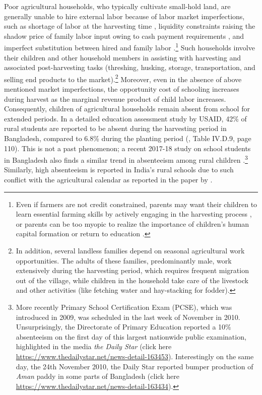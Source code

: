 \documentclass[12pt,letterpaper]{article}
\newcommand{\0}{\ensuremath{\mbox{\boldmath $0$}}}
\begin{document}
Poor agricultural households, who typically cultivate small-hold land, are generally unable to hire external labor because of labor market imperfections, such as shortage of labor at the harvesting time \citep{rosenzweig1988labor}, liquidity constraints raising the shadow price of family labor input owing to cash payment requirements \citep{singh1986agricultural}, and imperfect substitution between hired and family labor \citep{de1991peasant}.\footnote{Even if farmers are not credit constrained, parents may want their children to learn essential farming skills by actively engaging in the harvesting process \citep{bhalotra2003child}, or parents can be too myopic to realize the importance of children's human capital formation or return to education \citep{BalandRobinson2000}. } Such households involve their children and other household members in assisting with harvesting and associated post-harvesting tasks (threshing, husking, storage, transportation, and selling end products to the market).\footnote{In addition, several landless families depend on seasonal agricultural work opportunities. The adults of these families, predominantly male, work extensively during the harvesting period, which requires frequent migration out of the village, while children in the household take care of the livestock and other activities (like fetching water and hay-stacking for fodder). } Moreover, even in the absence of above mentioned market imperfections, the opportunity cost of schooling increases during harvest as the marginal revenue product of child labor increases. Consequently, children of agricultural households remain absent from school for extended periods. In a detailed education assessment study by USAID, 42\% of rural students are reported to be absent during the harvesting period in Bangladesh, compared to 6.8\% during the planting period (\cite{Rahman2004}, Table IV.D.9, page 110). This is not a past phenomenon; a recent 2017-18 study on school students in Bangladesh also finds a similar trend in absenteeism among rural children \citep{Fujii2019}.\footnote{More recently Primary School Certification Exam (PCSE), which was introduced in 2009, was scheduled in the last week of November in 2010. Unsurprisingly, the Directorate of Primary Education reported a 10$\%$ absenteeism on the first day of this largest nationwide public examination, highlighted in the media \textit{the Daily Star} (click here \url{https://www.thedailystar.net/news-detail-163453}). Interestingly on the same day, the 24th November 2010, the Daily Star reported bumper production of \textit{Aman} paddy in some parts of Bangladesh (click here \url{https://www.thedailystar.net/news-detail-163434}). } Similarly, high absenteeism is reported in India's rural schools due to such conflict with the agricultural calendar as reported in the paper by \cite{de2016estimating}.
\end{document}
